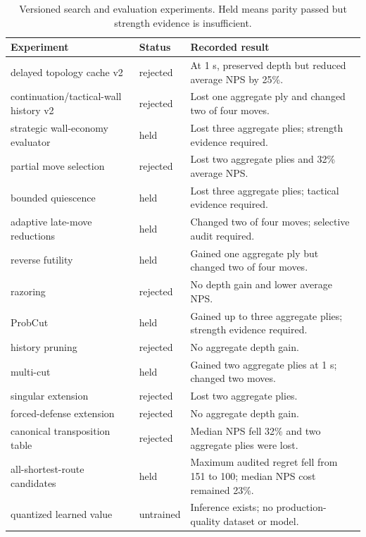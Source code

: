 \begin{table}[t]
\centering
\caption{Versioned search and evaluation experiments. Held means parity passed but strength evidence is insufficient.}
\label{tab:experiments}
\scriptsize
\begin{tabular}{p{}p{}p{}}
\toprule
Experiment & Status & Recorded result \\
\midrule
delayed topology cache v2 & rejected & At 1 s, preserved depth but reduced average NPS by 25\%. \\
continuation/tactical-wall history v2 & rejected & Lost one aggregate ply and changed two of four moves. \\
strategic wall-economy evaluator & held & Lost three aggregate plies; strength evidence required. \\
partial move selection & rejected & Lost two aggregate plies and 32\% average NPS. \\
bounded quiescence & held & Lost three aggregate plies; tactical evidence required. \\
adaptive late-move reductions & held & Changed two of four moves; selective audit required. \\
reverse futility & held & Gained one aggregate ply but changed two of four moves. \\
razoring & rejected & No depth gain and lower average NPS. \\
ProbCut & held & Gained up to three aggregate plies; strength evidence required. \\
history pruning & rejected & No aggregate depth gain. \\
multi-cut & held & Gained two aggregate plies at 1 s; changed two moves. \\
singular extension & rejected & Lost two aggregate plies. \\
forced-defense extension & rejected & No aggregate depth gain. \\
canonical transposition table & rejected & Median NPS fell 32\% and two aggregate plies were lost. \\
all-shortest-route candidates & held & Maximum audited regret fell from 151 to 100; median NPS cost remained 23\%. \\
quantized learned value & untrained & Inference exists; no production-quality dataset or model. \\
\bottomrule
\end{tabular}
\end{table}
